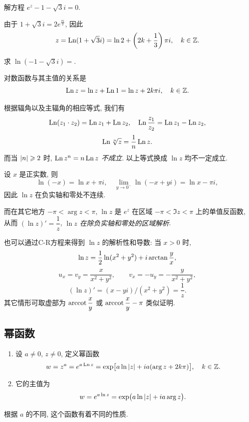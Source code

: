 \documentclass[nocolor,theme=doremi,lang=cn,11pt,chinese,twoside,openright,usesamecnt]{elegantbook}
\newenvironment{alertblock}[1]{\begin{tcolorbox}[alertstyle,title=#1]}{\end{tcolorbox}}
\begin{document}
\begin{example}
	解方程 $e^z-1-\sqrt 3i=0$.
\end{example}

\begin{solution}
	由于 $1+\sqrt 3 i=2e^{\frac{\pi i}3}$,
	{因此
	\[z=\operatorname{Ln}(1+\sqrt 3i)=\ln 2+\left(2k+\frac13\right)\pi i,\quad k\in{\mathbb{Z}}.\]}
\end{solution}

\begin{exercise}
	求 $\ln(-1-\sqrt3 i)=$.
\end{exercise}

对数函数与其主值的关系是
\[\operatorname{Ln} z=\ln z+\operatorname{Ln} 1=\ln z+2k\pi i,\quad k\in{\mathbb{Z}}.\]

根据辐角以及主辐角的相应等式, 我们有
\[\operatorname{Ln}(z_1\cdot z_2)=\operatorname{Ln} z_1+\operatorname{Ln} z_2,\quad
\operatorname{Ln}\frac{z_1}{z_2}=\operatorname{Ln} z_1-\operatorname{Ln} z_2,\]
\[\operatorname{Ln} \sqrt[n]z=\dfrac1n\operatorname{Ln} z.\]
而当 $\left|n\right|\geqslant 2$ 时, \emph{$\operatorname{Ln} z^n=n\operatorname{Ln} z$ 不成立}.
以上等式换成 $\ln z$ 均不一定成立.


设 $x$ 是正实数, 
则
\[\ln (-x)=\ln x+\pi i,\quad
\lim_{y\to0^-}\ln (-x+yi)=\ln x-\pi i,\]
因此 $\ln z$ 在负实轴和零处不连续.

而在其它地方 $-\pi<\arg z<\pi$, $\ln z$ 是 $e^z$ 在区域 $-\pi<\Im z<\pi$ 上的单值反函数, 
从而 \emph{$(\ln z)'=\dfrac 1z$}, \emph{$\ln z$ 在除负实轴和零处的区域解析}.

也可以通过C-R方程来得到 $\ln z$ 的解析性和导数: 当 $x>0$ 时,
\[\ln z=\frac{1}{2} \ln(x^2+y^2)+i\arctan \frac yx,\]
\[u_x=v_y=\frac x{x^2+y^2},\qquad v_x=-u_y=-\frac y{x^2+y^2},\]
\[(\ln z)'=(x-yi)/(x^2+y^2)=\frac 1z.\]
其它情形可取虚部为 $\operatorname{arccot}\dfrac xy$ 或 $\operatorname{arccot}\dfrac xy-\pi$ 类似证明.

\subsection{幂函数}

\begin{alertblock}{幂函数}
	\begin{enumerate}
		\item 设 $a\neq 0$, $z\neq 0$, 定义幂函数
		\[w=z^a=e^{a\operatorname{Ln} z}
		=\exp\bigl[a\ln\left|z\right|+ia(\arg z+2k\pi)\bigr],\quad k\in{\mathbb{Z}}.\]
		\item 它的主值为
		\[w=e^{a\ln z}=\exp\bigl(a\ln\left|z\right|+ia\arg z\bigr).\]
	\end{enumerate}
\end{alertblock}

根据 $a$ 的不同, 这个函数有着不同的性质.
\end{document}
